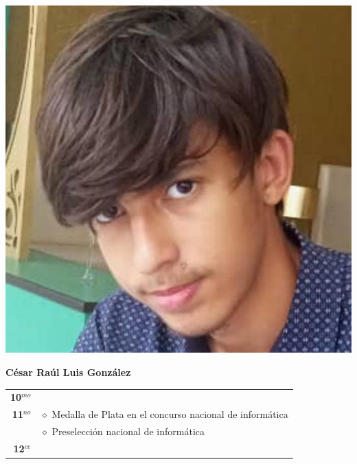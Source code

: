 \begin{minipage}{0.2\textwidth}
	\includegraphics[width=\linewidth]{img/concursantes/cesar.png} %
\end{minipage}
\hfill
\begin{minipage}{0.7\textwidth}
	\textbf{César Raúl Luis González}
	
	\vspace*{0.1in}
	\begin{tabular}{rl}
		
		\textbf{10$^{mo}$} &   \\
		
		\textbf{11$^{no}$} & $\diamond$ Medalla de Plata en el concurso nacional de informática \\
		                   & $\diamond$ Preselección nacional de informática  \\
		
		\textbf{12$^{ce}$} &   \\
	\end{tabular}
\end{minipage}

